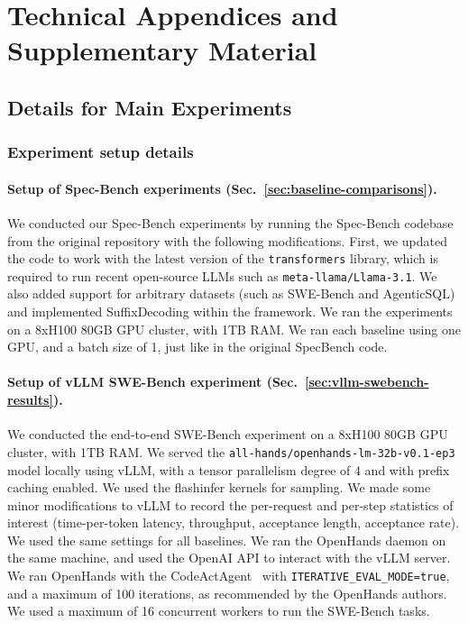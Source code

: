 \section{Technical Appendices and Supplementary Material}


\subsection{Details for Main Experiments}
\label{sec:main-experiment-details}

\subsubsection{Experiment setup details}
\label{sec:experiment-setup-details}

\paragraph{Setup of Spec-Bench experiments (Sec.~\ref{sec:baseline-comparisons}).}
We conducted our Spec-Bench experiments by running the Spec-Bench codebase from the original repository with the following modifications. First, we updated the code to work with the latest version of the \texttt{transformers} library, which is required to run recent open-source LLMs such as \texttt{meta-llama/Llama-3.1}. We also added support for arbitrary datasets (such as SWE-Bench and AgenticSQL) and implemented SuffixDecoding within the framework. We ran the experiments on a 8xH100 80GB GPU cluster, with 1TB RAM. We ran each baseline using one GPU, and a batch size of 1, just like in the original SpecBench code. 

\paragraph{Setup of vLLM SWE-Bench experiment (Sec.~\ref{sec:vllm-swebench-results}).}
We conducted the end-to-end SWE-Bench experiment on a 8xH100 80GB GPU cluster, with 1TB RAM. We served the \texttt{all-hands/openhands-lm-32b-v0.1-ep3} model locally using vLLM, with a tensor parallelism degree of 4 and with prefix caching enabled. We used the flashinfer kernels for sampling. We made some minor modifications to vLLM to record the per-request and per-step statistics of interest (time-per-token latency, throughput, acceptance length, acceptance rate). We used the same settings for all baselines. We ran the OpenHands daemon on the same machine, and used the OpenAI API to interact with the vLLM server. We ran OpenHands with the CodeActAgent~\citep{wang2024executablecodeactionselicit} with \texttt{ITERATIVE\_EVAL\_MODE=true}, and a maximum of 100 iterations, as recommended by the OpenHands authors. We used a maximum of 16 concurrent workers to run the SWE-Bench tasks.

